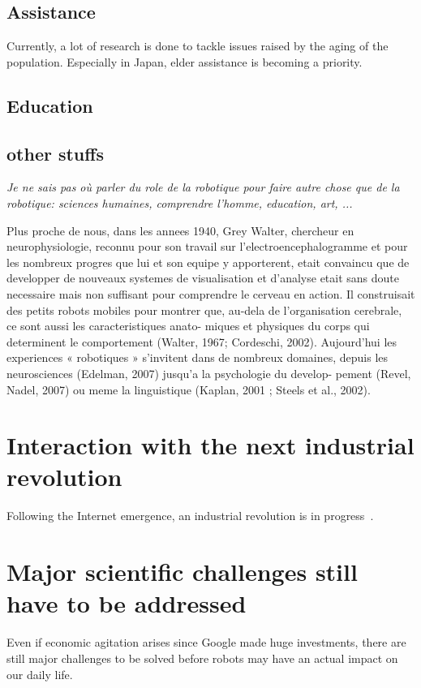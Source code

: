 \subsection{Assistance} %
Currently, a lot of research is done to tackle issues raised by the aging of the population.
Especially in Japan, elder assistance is becoming a priority.


\subsection{Education} %


\subsection{other stuffs} %
\emph{Je ne sais pas où parler du role de la robotique pour faire autre chose que de la robotique: sciences humaines, comprendre l'homme, education, art, ...}

Plus proche de nous, dans les annees 1940, Grey Walter, chercheur en neurophysiologie, reconnu pour son travail sur l’electroencephalogramme et pour les nombreux progres que lui et son equipe y apporterent, etait convaincu que de developper de nouveaux systemes de visualisation et d’analyse etait sans doute necessaire mais non suffisant pour comprendre le cerveau en action. Il construisait des petits robots mobiles pour montrer que, au-dela de l’organisation cerebrale, ce sont aussi les caracteristiques anato- miques et physiques du corps qui determinent le comportement (Walter, 1967; Cordeschi, 2002). Aujourd’hui les experiences « robotiques » s’invitent dans de nombreux domaines, depuis les neurosciences (Edelman, 2007) jusqu’a la psychologie du develop- pement (Revel, Nadel, 2007) ou meme la linguistique (Kaplan, 2001 ; Steels et al., 2002).

\section{Interaction with the next industrial revolution} %
Following the Internet emergence, an industrial revolution is in progress~\cite{anderson2012makers}.


\section{Major scientific challenges still have to be addressed} %

Even if economic agitation arises since Google made huge investments, there are still major challenges to be solved before robots may have an actual impact on our daily life.


